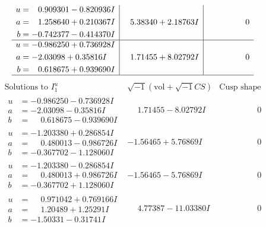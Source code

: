 \documentclass[1p]{elsarticle_modified}
\theoremstyle{definition}
\newcommand{\I}{\sqrt{-1}}
\begin{document}
$$\begin{array}{c|c|c}
\begin{aligned}
u &= \phantom{-}0.909301 - 0.820936 I \\
a &= \phantom{-}1.258640 + 0.210367 I \\
b &= -0.742377 - 0.414370 I\end{aligned}
 & \phantom{-}5.38340 + 2.18763 I & \phantom{-0.000000 } 0 \\ \hline\begin{aligned}
u &= -0.986250 + 0.736928 I \\
a &= -2.03098 + 0.35816 I \\
b &= \phantom{-}0.618675 + 0.939690 I\end{aligned}
 & \phantom{-}1.71455 + 8.02792 I & \phantom{-0.000000 } 0\\
 \hline 
 \end{array}$$\newpage$$\begin{array}{c|c|c}  
\text{Solutions to }I^u_{1}& \I (\text{vol} + \sqrt{-1}CS) & \text{Cusp shape}\\
 \hline 
\begin{aligned}
u &= -0.986250 - 0.736928 I \\
a &= -2.03098 - 0.35816 I \\
b &= \phantom{-}0.618675 - 0.939690 I\end{aligned}
 & \phantom{-}1.71455 - 8.02792 I & \phantom{-0.000000 } 0 \\ \hline\begin{aligned}
u &= -1.203380 + 0.286854 I \\
a &= \phantom{-}0.480013 - 0.986726 I \\
b &= -0.367702 - 1.128060 I\end{aligned}
 & -1.56465 + 5.76869 I & \phantom{-0.000000 } 0 \\ \hline\begin{aligned}
u &= -1.203380 - 0.286854 I \\
a &= \phantom{-}0.480013 + 0.986726 I \\
b &= -0.367702 + 1.128060 I\end{aligned}
 & -1.56465 - 5.76869 I & \phantom{-0.000000 } 0 \\ \hline\begin{aligned}
u &= \phantom{-}0.971042 + 0.769166 I \\
a &= \phantom{-}1.20489 + 1.25291 I \\
b &= -1.50331 - 0.31741 I\end{aligned}
 & \phantom{-}4.77387 - 11.03380 I & \phantom{-0.000000 } 0 \\ \hline\begin{aligned}

\end{aligned}
\end{array}$$
\end{document}
